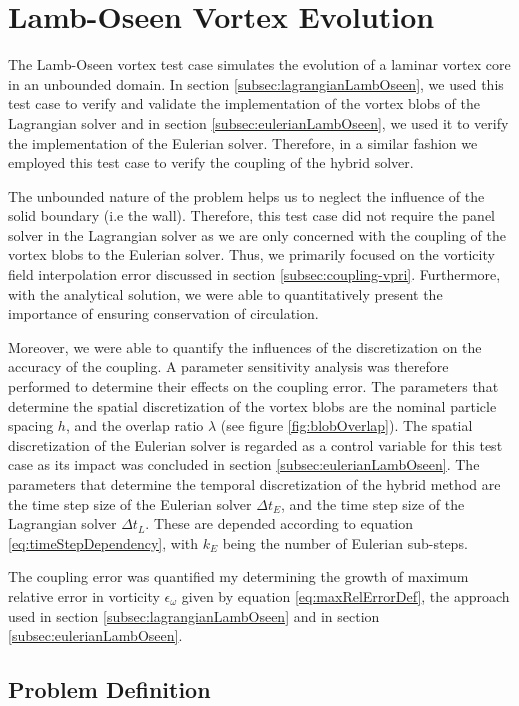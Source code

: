 \section{Lamb-Oseen Vortex Evolution}
\label{sec:vvhm-love}
The Lamb-Oseen vortex test case simulates the evolution of a laminar vortex core in an unbounded domain. In section \ref{subsec:lagrangianLambOseen}, we used this test case to verify and validate the implementation of the vortex blobs of the Lagrangian solver and in section \ref{subsec:eulerianLambOseen}, we used it to verify the implementation of the Eulerian solver. Therefore, in a similar fashion we employed this test case to verify the coupling of the hybrid solver. 

The unbounded nature of the problem helps us to neglect the influence of the solid boundary (i.e the wall). Therefore, this test case did not require the panel solver in the Lagrangian solver as we are only concerned with the coupling of the vortex blobs to the Eulerian solver. Thus, we primarily focused on the vorticity field interpolation error discussed in section \ref{subsec:coupling-vpri}. Furthermore, with the analytical solution, we were able to quantitatively present the importance of ensuring conservation of circulation.

Moreover, we were able to quantify the influences of the discretization on the accuracy of the coupling. A parameter sensitivity analysis was therefore performed to determine their effects on the coupling error. The parameters that determine the spatial discretization of the vortex blobs are the nominal particle spacing $h$, and the overlap ratio $\lambda$ (see figure \ref{fig:blobOverlap}). The spatial discretization of the Eulerian solver is regarded as a control variable for this test case as its impact was concluded in section \ref{subsec:eulerianLambOseen}. The parameters that determine the temporal discretization of the hybrid method are the time step size of the Eulerian solver $\Delta t_E$, and the time step size of the Lagrangian solver $\Delta t_L$. These are depended according to equation \ref{eq:timeStepDependency}, with $k_E$ being the number of Eulerian sub-steps.

The coupling error was quantified my determining the growth of maximum relative error in vorticity $\epsilon_{\omega}$ given by equation \ref{eq:maxRelErrorDef}, the approach used in section \ref{subsec:lagrangianLambOseen} and in section \ref{subsec:eulerianLambOseen}. 


\subsection{Problem Definition}

